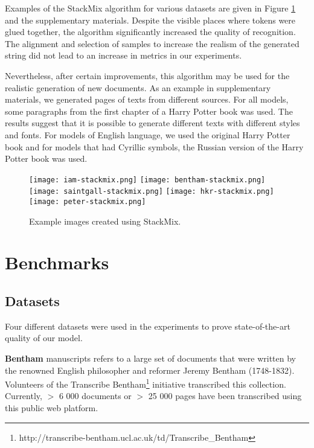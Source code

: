\documentclass[10pt,twocolumn,letterpaper]{article}
\begin{document}
Examples of the StackMix algorithm for various datasets are given in Figure \ref{fig:stackmix-examples} and the supplementary materials. Despite the visible places where tokens were glued together, the algorithm significantly increased the quality of recognition. The alignment and selection of samples to increase the realism of the generated string did not lead to an increase in metrics in our experiments. 

Nevertheless, after certain improvements, this algorithm may be used for the realistic generation of new documents. As an example in supplementary materials, we generated pages of texts from different sources. For all models, some paragraphs from the first chapter of a Harry Potter book was used. The results suggest that it is possible to generate different texts with different styles and fonts. For models of English language, we used the original Harry Potter book and for models that had Cyrillic symbols, the Russian version of the Harry Potter book was used.

\begin{figure}
\begin{center}
\texttt{[image: iam-stackmix.png]}
    \label{fig:example1_c}
    \texttt{[image: bentham-stackmix.png]}
    \label{fig:example2_c}
    \texttt{[image: saintgall-stackmix.png]}
    \label{fig:example3_c}
    \texttt{[image: hkr-stackmix.png]}
    \label{fig:example4_c}
    \texttt{[image: peter-stackmix.png]}
    \label{fig:example5_c}
\end{center}
   \caption{Example images created using StackMix.}
\label{fig:stackmix-examples}
\end{figure}

\section{Benchmarks}

\subsection{Datasets}
Four different datasets were used in the experiments to prove state-of-the-art quality of our model.

\medskip
\noindent 
\textbf{Bentham} manuscripts refers to a large set of documents that were written by the renowned English philosopher and reformer Jeremy Bentham (1748-1832). Volunteers of the Transcribe Bentham\footnote{http://transcribe-bentham.ucl.ac.uk/td/Transcribe\_Bentham} initiative transcribed this collection. 
Currently, $>$ 6 000 documents or $>$ 25 000 pages have been transcribed using this public web platform.
\end{document}
